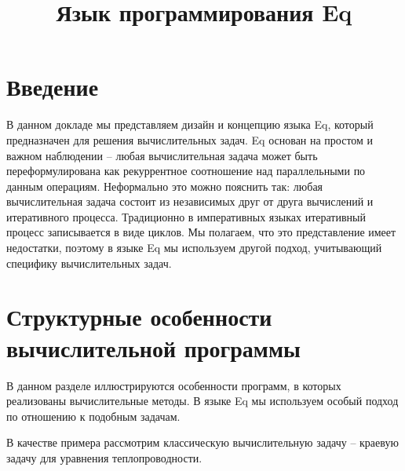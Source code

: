 \documentclass[a4paper]{llncs}
\title{Язык программирования Eq}
\institute{}
\author{}
\begin{document}
\maketitle
\section*{Введение}
В данном докладе мы представляем дизайн и концепцию языка Eq, который предназначен для решения вычислительных задач. Eq основан на простом и важном наблюдении -- любая вычислительная задача может быть переформулирована как рекуррентное соотношение над параллельными по данным операциям. Неформально это можно пояснить так: любая вычислительная задача состоит из независимых друг от друга вычислений и итеративного процесса. Традиционно в императивных языках итеративный процесс записывается в виде циклов. Мы полагаем, что это представление имеет недостатки, поэтому в языке Eq мы используем другой подход, учитывающий специфику вычислительных задач.

\section*{Структурные особенности вычислительной программы}
В данном разделе иллюстрируются особенности программ, в которых реализованы вычислительные методы. В языке Eq мы используем особый подход по отношению к подобным задачам.

В качестве примера рассмотрим классическую вычислительную задачу -- краевую задачу для уравнения теплопроводности.
\end{document}
